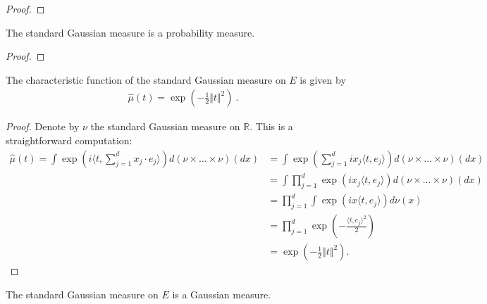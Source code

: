 \begin{proof}\mathlibok

\end{proof}


\begin{lemma}\label{lem:isProbabilityMeasure_stdGaussian}
  \mathlibok
The standard Gaussian measure is a probability measure.
\end{lemma}

\begin{proof}\mathlibok

\end{proof}


\begin{lemma}\label{lem:charFun_stdGaussian}
  \mathlibok
The characteristic function of the standard Gaussian measure on $E$ is given by
\begin{align*}
  \hat{\mu}(t) = \exp\left(-\frac{1}{2} \Vert t \Vert^2 \right) \: .
\end{align*}
\end{lemma}

\begin{proof}\mathlibok
Denote by $\nu$ the standard Gaussian measure on $\mathbb{R}$. This is a straightforward computation:
\begin{align*}
  \hat{\mu}(t) = \int \exp\left(i\langle t, \sum_{j=1}^d x_j \cdot e_j \rangle\right) d(\nu \times \ldots \times \nu)(dx) &= \int \exp\left(\sum_{j=1}^d ix_j\langle t, e_j \rangle\right) d(\nu \times \ldots \times \nu)(dx) \\
  &= \int \prod_{j=1}^d \exp\left(ix_j\langle t, e_j \rangle\right) d(\nu \times \ldots \times \nu)(dx) \\
  &= \prod_{j=1}^d \int \exp\left(ix\langle t, e_j \rangle\right) d\nu(x) \\
  &= \prod_{j=1}^d \exp\left(-\frac{\langle t, e_j \rangle^2}{2}\right) \\
  &= \exp\left(-\frac{1}{2} \Vert t \Vert^2 \right).
\end{align*}
\end{proof}


\begin{lemma}\label{lem:isGaussian_stdGaussian}
  \mathlibok
The standard Gaussian measure on $E$ is a Gaussian measure.
\end{lemma}

